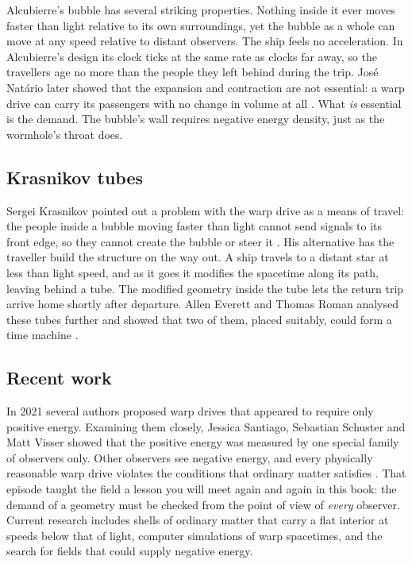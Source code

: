 Alcubierre's bubble has several striking properties. Nothing inside it ever
moves faster than light relative to its own surroundings, yet the bubble as a
whole can move at any speed relative to distant observers. The ship feels no
acceleration. In Alcubierre's design its clock ticks at the same rate as clocks
far away, so the travellers age no more than the people they left behind
during the trip. José Natário later showed that the expansion and contraction
are not essential: a warp drive can carry its passengers with no change in
volume at all \parencite{Natario2002}. What \emph{is} essential is the demand.
The bubble's wall requires negative energy density, just as the wormhole's
throat does.

\subsection{Krasnikov tubes}

Sergei Krasnikov pointed out a problem with the warp drive as a means of
travel: the people inside a bubble moving faster than light cannot send signals
to its front edge, so they cannot create the bubble or steer it
\parencite{Krasnikov1998}. His alternative has the traveller build the
structure on the way out. A ship travels to a distant star at less than light
speed, and as it goes it modifies the spacetime along its path, leaving behind
a tube. The modified geometry inside the tube lets the return trip arrive home
shortly after departure. Allen Everett and Thomas Roman analysed these tubes
further and showed that two of them, placed suitably, could form a time
machine \parencite{Everett1997}.

\subsection{Recent work}

In 2021 several authors proposed warp drives that appeared to require only
positive energy. Examining them closely, Jessica Santiago, Sebastian Schuster
and Matt Visser showed that the positive energy was measured by one special
family of observers only. Other observers see negative energy, and every
physically reasonable warp drive violates the conditions that ordinary matter
satisfies \parencite{Santiago2022}. That episode taught the field a lesson you
will meet again and again in this book: the demand of a geometry must be
checked from the point of view of \emph{every} observer. Current research
includes shells of ordinary matter that carry a flat interior at speeds below
that of light, computer simulations of warp spacetimes, and the search for
fields that could supply negative energy.

